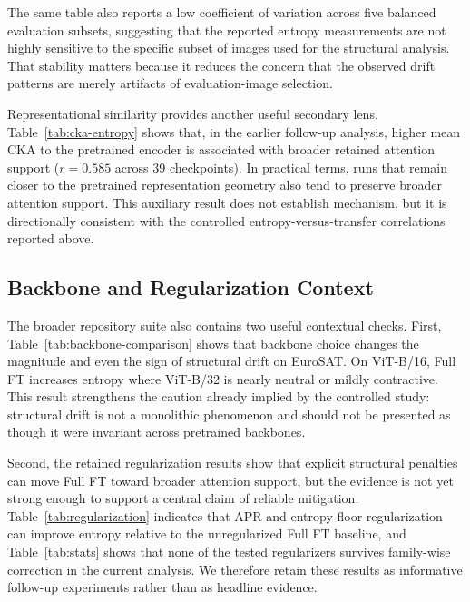 \documentclass[10pt]{article}
\begin{document}
The same table also reports a low coefficient of variation across five balanced evaluation subsets, suggesting that the reported entropy measurements are not highly sensitive to the specific subset of images used for the structural analysis. That stability matters because it reduces the concern that the observed drift patterns are merely artifacts of evaluation-image selection.

Representational similarity provides another useful secondary lens. Table~\ref{tab:cka-entropy} shows that, in the earlier follow-up analysis, higher mean CKA to the pretrained encoder is associated with broader retained attention support ($r=0.585$ across 39 checkpoints). In practical terms, runs that remain closer to the pretrained representation geometry also tend to preserve broader attention support. This auxiliary result does not establish mechanism, but it is directionally consistent with the controlled entropy-versus-transfer correlations reported above.




\subsection{Backbone and Regularization Context}
The broader repository suite also contains two useful contextual checks. First, Table~\ref{tab:backbone-comparison} shows that backbone choice changes the magnitude and even the sign of structural drift on EuroSAT. On ViT-B/16, Full FT increases entropy where ViT-B/32 is nearly neutral or mildly contractive. This result strengthens the caution already implied by the controlled study: structural drift is not a monolithic phenomenon and should not be presented as though it were invariant across pretrained backbones.

Second, the retained regularization results show that explicit structural penalties can move Full FT toward broader attention support, but the evidence is not yet strong enough to support a central claim of reliable mitigation. Table~\ref{tab:regularization} indicates that APR and entropy-floor regularization can improve entropy relative to the unregularized Full FT baseline, and Table~\ref{tab:stats} shows that none of the tested regularizers survives family-wise correction in the current analysis. We therefore retain these results as informative follow-up experiments rather than as headline evidence.




\end{document}
